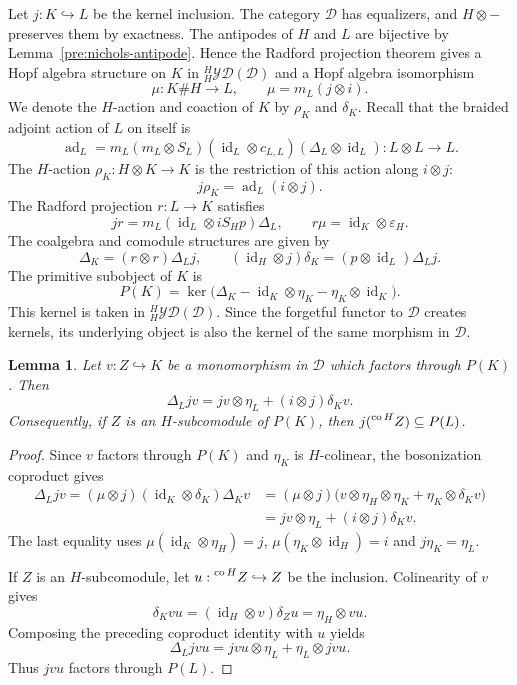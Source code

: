 \documentclass[11pt, a4paper]{article}
\numberwithin{equation}{section}
\newcommand{\D}{\mathcal D}
\newcommand{\YD}{\mathcal{YD}}
\DeclareMathOperator{\id}{id}
\DeclareMathOperator{\ad}{ad}
\DeclareMathOperator{\co}{co}
\newtheorem{lemma}[theorem]{Lemma}
\begin{document}
Let $j:K\hookrightarrow L$ be the kernel inclusion.
The category $\D$ has equalizers, and $H\otimes-$ preserves them by
exactness. The antipodes of $H$ and $L$ are bijective by
Lemma~\ref{pre:nichols-antipode}. Hence the Radford projection theorem
\cite[Theorem~3.10]{Simon} gives a Hopf algebra structure on $K$ in
${}_H^H\YD(\D)$ and a Hopf algebra isomorphism
\[
 \mu:K\#H\longrightarrow L,
 \qquad \mu=m_L(j\otimes i).
\]
We denote the $H$-action and coaction of $K$ by $\rho_K$ and $\delta_K$.
Recall that the braided adjoint action of $L$ on itself is
\[
 \ad_L
 =m_L(m_L\otimes S_L)
   (\id_L\otimes c_{L,L})(\Delta_L\otimes\id_L)
 :L\otimes L\longrightarrow L.
\]
The $H$-action $\rho_K:H\otimes K\to K$ is the restriction
of this action along $i\otimes j$:
\[
 j\rho_K=\ad_L(i\otimes j).
\]
The Radford projection $r:L\to K$ satisfies
\begin{equation}\label{coinv:projection}
 jr=m_L(\id_L\otimes iS_Hp)\Delta_L,
 \qquad r\mu=\id_K\otimes\varepsilon_H.
\end{equation}
The coalgebra and comodule structures are given by
\begin{equation}\label{coinv:structures}
 \Delta_K=(r\otimes r)\Delta_Lj,
 \qquad
 (\id_H\otimes j)\delta_K=(p\otimes\id_L)\Delta_Lj.
\end{equation}
The primitive subobject of $K$ is
\[
 P(K)=\ker\bigl(\Delta_K-\id_K\otimes\eta_K
                         -\eta_K\otimes\id_K\bigr).
\]
This kernel is taken in ${}_H^H\YD(\D)$.
Since the forgetful functor to $\D$ creates kernels,
its underlying object is also the kernel of the same
morphism in $\D$.
\begin{lemma}\label{coinv:primitive}
Let $v:Z\hookrightarrow K$ be a monomorphism in $\D$
which factors through $P(K)$. Then
\[
\Delta_Ljv
   =jv\otimes\eta_L+(i\otimes j)\delta_Kv.
\]
Consequently, if $Z$ is an $H$-subcomodule of $P(K)$, then
$j(\prescript{\co H}{}{Z})\subseteq P(L)$.
\end{lemma}


\begin{proof}

Since $v$ factors through $P(K)$ and $\eta_K$ is $H$-colinear,
the bosonization coproduct gives
\[
 \begin{aligned}
 \Delta_Ljv
 =(\mu\otimes j)(\id_K\otimes\delta_K)\Delta_Kv
 &=(\mu\otimes j)
   \bigl(v\otimes\eta_H\otimes\eta_K
         +\eta_K\otimes\delta_Kv\bigr)\\
 &=jv\otimes\eta_L+(i\otimes j)\delta_Kv.
 \end{aligned}
\]
The last equality uses
$\mu(\id_K\otimes\eta_H)=j$,
$\mu(\eta_K\otimes\id_H)=i$ and $j\eta_K=\eta_L$.

If $Z$ is an $H$-subcomodule, let
$u:\prescript{\co H}{}{Z}\hookrightarrow Z$ be the inclusion.
Colinearity of $v$ gives
\[
 \delta_Kvu=(\id_H\otimes v)\delta_Zu
           =\eta_H\otimes vu.
\]
Composing the preceding coproduct identity with $u$ yields
\[
 \Delta_Ljvu=jvu\otimes\eta_L+\eta_L\otimes jvu.
\]
Thus $jvu$ factors through $P(L)$.
\end{proof}
\end{document}
